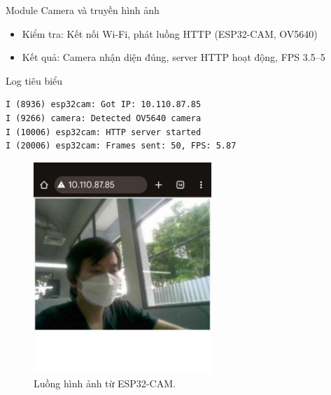 \begin{frame}[fragile]{Module Camera và truyền hình ảnh}
    \begin{itemize}
        \item Kiểm tra: Kết nối Wi-Fi, phát luồng HTTP (ESP32-CAM, OV5640)
        \item Kết quả: Camera nhận diện đúng, server HTTP hoạt động, FPS 3.5–5
    \end{itemize}
    \begin{block}{Log tiêu biểu}
        \begin{verbatim}
I (8936) esp32cam: Got IP: 10.110.87.85
I (9266) camera: Detected OV5640 camera
I (10006) esp32cam: HTTP server started
I (20006) esp32cam: Frames sent: 50, FPS: 5.87
        \end{verbatim}
    \end{block}
    \begin{figure}
        \centering
        \includegraphics[width=0.6\textwidth]{images/module2_stream_example.jpg}
        \caption{Luồng hình ảnh từ ESP32-CAM.}
    \end{figure}
\end{frame}

